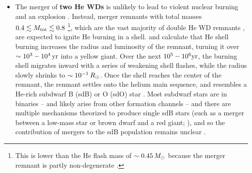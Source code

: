 
\begin{itemize}
	\item The merger of {\bf two He WDs} is unlikely to lead to violent nuclear burning and an explosion \citep{dan+12,dan+14}.  Instead, merger remnants with total masses $0.4\lesssim \Mtot \lesssim 0.8$ \citep{han+02,ibent85}\footnote{This is lower than the He flash mass of $\sim0.45\,\Msun$ because the merger remnant is partly non-degenerate \citep{ibent85, han+02}.}, which are the vast majority of double He WD remnants \citep{nele10}, are expected to ignite He burning in a shell.  \cite{saioj00} and \cite{zhanj12} calculate that He shell burning increases the radius and luminosity of the remnant, turning it over $\sim 10^3-10^4\,\mathrm{yr}$ into a yellow giant.  Over the next $10^5-10^6\mathrm{yr}$, the burning shell migrates inward with a series of weakening shell flashes, while the radius slowly shrinks to $\sim10^{-1}\,\Rsun$.  Once the shell reaches the center of the remnant, the remnant settles onto the helium main sequence, and resembles a He-rich subdwarf B (sdB) or O (sdO) star \citep{saioj00, justph11, zhanj12, hebe16}.  Most subdwarf stars are in binaries -- and likely arise from other formation channels -- and there are multiple mechanisms theorized to produce single sdB stars (such as a merger between a low-mass star or brown dwarf and a red giant; \citealt{soke98}), and so the contribution of mergers to the sdB population remains unclear \citep{nele10, hebe16}.





\end{itemize}
